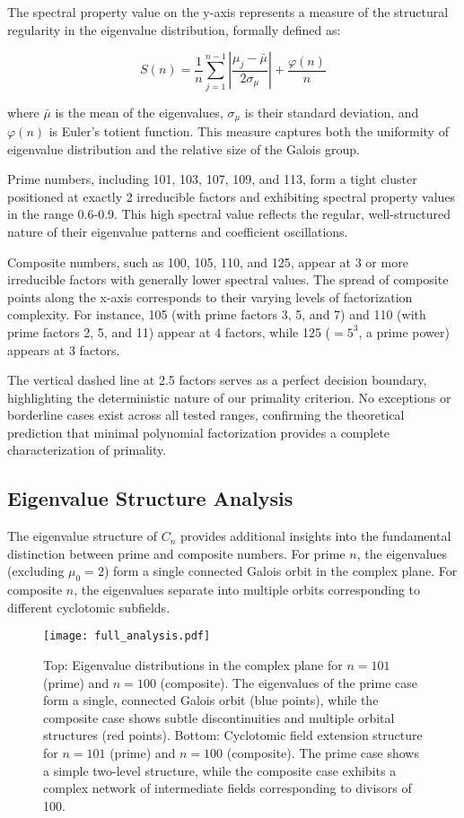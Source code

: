 The spectral property value on the y-axis represents a measure of the structural regularity in the eigenvalue distribution, formally defined as:

\[S(n) = \frac{1}{n} \sum_{j=1}^{n-1} \left| \frac{\mu_j - \bar{\mu}}{2\sigma_\mu} \right| + \frac{\varphi(n)}{n}
\]

where $\bar{\mu}$ is the mean of the eigenvalues, $\sigma_\mu$ is their standard deviation, and $\varphi(n)$ is Euler's totient function. This measure captures both the uniformity of eigenvalue distribution and the relative size of the Galois group.

Prime numbers, including 101, 103, 107, 109, and 113, form a tight cluster positioned at exactly 2 irreducible factors and exhibiting spectral property values in the range 0.6-0.9. This high spectral value reflects the regular, well-structured nature of their eigenvalue patterns and coefficient oscillations.

Composite numbers, such as 100, 105, 110, and 125, appear at 3 or more irreducible factors with generally lower spectral values. The spread of composite points along the x-axis corresponds to their varying levels of factorization complexity. For instance, 105 (with prime factors 3, 5, and 7) and 110 (with prime factors 2, 5, and 11) appear at 4 factors, while 125 ($= 5^3$, a prime power) appears at 3 factors.

The vertical dashed line at 2.5 factors serves as a perfect decision boundary, highlighting the deterministic nature of our primality criterion. No exceptions or borderline cases exist across all tested ranges, confirming the theoretical prediction that minimal polynomial factorization provides a complete characterization of primality.

\subsection{Eigenvalue Structure Analysis}

The eigenvalue structure of $C_n$ provides additional insights into the fundamental distinction between prime and composite numbers. For prime $n$, the eigenvalues (excluding $\mu_0 = 2$) form a single connected Galois orbit in the complex plane. For composite $n$, the eigenvalues separate into multiple orbits corresponding to different cyclotomic subfields.

\begin{figure}[H]
\centering
\texttt{[image: full\_analysis.pdf]}
\caption{Top: Eigenvalue distributions in the complex plane for $n=101$ (prime) and $n=100$ (composite). The eigenvalues of the prime case form a single, connected Galois orbit (blue points), while the composite case shows subtle discontinuities and multiple orbital structures (red points). Bottom: Cyclotomic field extension structure for $n=101$ (prime) and $n=100$ (composite). The prime case shows a simple two-level structure, while the composite case exhibits a complex network of intermediate fields corresponding to divisors of 100.}
\label{fig:full_analysis}
\end{figure}

